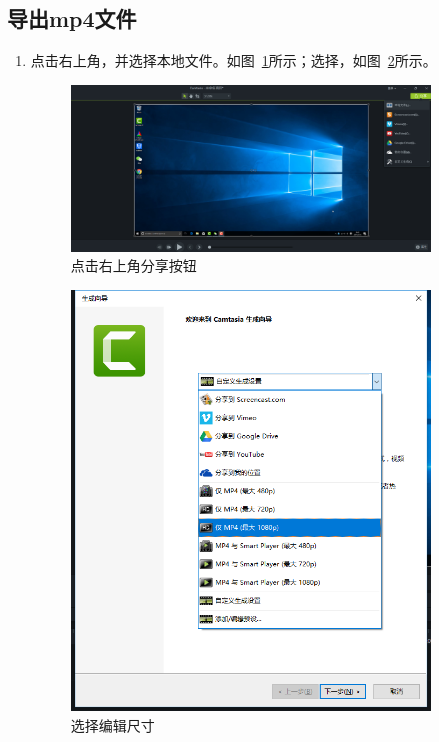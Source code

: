 \documentclass[12pt]{ctexart}
\begin{document}
\subsection{导出mp4文件}\label{sec:daochu}
\begin{enumerate}
\item 点击右上角{\color{blue}{分享}}，并选择本地文件。如图~\ref{fig:04.jpg}所示；选择{\color{blue}{1080p}}，如图~\ref{fig:05.jpg}所示。\par
    \begin{figure}[!ht]
    \centering
    \includegraphics[width=0.9\textwidth]{04.jpg}
    \caption{点击右上角分享按钮}
    \label{fig:04.jpg}
    \end{figure}
    \begin{figure}
    \centering
    \includegraphics[width=0.9\textwidth]{05.jpg}
    \caption{选择编辑尺寸}
    \label{fig:05.jpg}
    \end{figure}
 

\end{enumerate}
\end{document}
